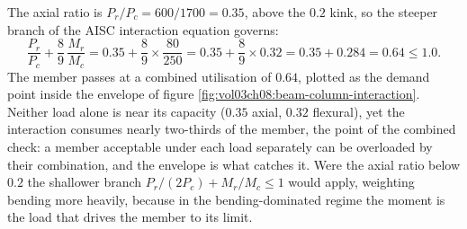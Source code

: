 The axial ratio is $P_r/P_c = 600/1700 = 0.35$, above the $0.2$ kink, so
the steeper branch of the AISC interaction equation governs:
\[
\frac{P_r}{P_c} + \frac{8}{9}\,\frac{M_r}{M_c}
= 0.35 + \frac{8}{9}\times\frac{80}{250}
= 0.35 + \frac{8}{9}\times 0.32 = 0.35 + 0.284 = 0.64 \leq 1.0.
\]
The member passes at a combined utilisation of $0.64$, plotted as the
demand point inside the envelope of figure
\ref{fig:vol03ch08:beam-column-interaction}. Neither load alone is near
its capacity ($0.35$ axial, $0.32$ flexural), yet the interaction
consumes nearly two-thirds of the member, the point of the combined
check: a member acceptable under each load separately can be overloaded
by their combination, and the envelope is what catches it. Were the
axial ratio below $0.2$ the shallower branch $P_r/(2P_c) + M_r/M_c \leq
1$ would apply, weighting bending more heavily, because in the
bending-dominated regime the moment is the load that drives the member
to its limit.





